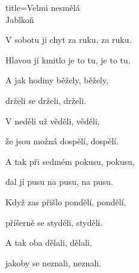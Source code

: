 \begin{song}{title=\predtitle\centering Velmi nesmělá \\\large Jablkoň  \vspace*{-0.3cm}}
\begin{centerjustified}
\begin{varwidth}[t]{0.48\textwidth}
\end{varwidth}\mezisloupci\begin{varwidth}[t]{0.48\textwidth}\setlength{\parindent}{0.45cm}\vspace*{0.55cm}  %
\vspace*{-.185cm}
\sloka
	V sobotu ji chyt za ruku, za ruku.
	
	Hlavou jí kmitlo je to tu, je to tu.
	
	A jak hodiny běžely, běžely,
	
	drželi se drželi, drželi.


	
\sloka
	V neděli už věděli, věděli,

	že jsou možná dospělí, dospělí.
	
	A tak při sedmém pokusu, pokusu,
	
	dal jí pusu na pusu, na pusu.


\sloka
	Když zas přišlo pondělí, pondělí,
	
	příšerně se styděli, styděli.
	
	A tak oba dělali, dělali,
	
	jakoby se neznali, neznali.

\phantom{.}

\phantom{.}





\end{varwidth}

\end{centerjustified}
\setcounter{Slokočet}{0}
\end{song}
